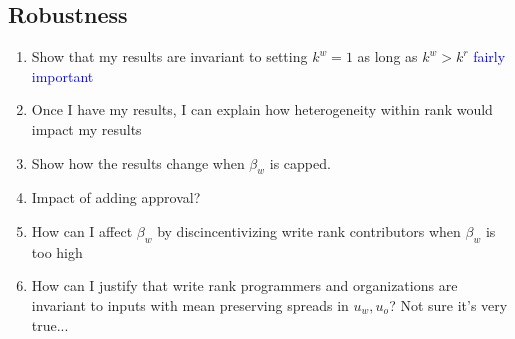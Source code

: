 \documentclass[source/paper/main.tex]{subfiles}
\begin{document}
\subsection{Robustness}
\begin{enumerate}
    \item Show that my results are invariant to setting $k^w = 1$ as long as $k^w>k^r$ \textcolor{blue}{fairly important}
    \item Once I have my results, I can explain how heterogeneity within rank would impact my results
    \item Show how the results change when $\beta_w$ is capped. 
    \item Impact of adding approval?
    \item How can I affect $\beta_w$ by discincentivizing write rank contributors when $\beta_w$ is too high
    \item How can I justify that write rank programmers and organizations are invariant to inputs with mean preserving spreads in $u_w, u_o$? Not sure it's very true...
\end{enumerate}
\end{document}
